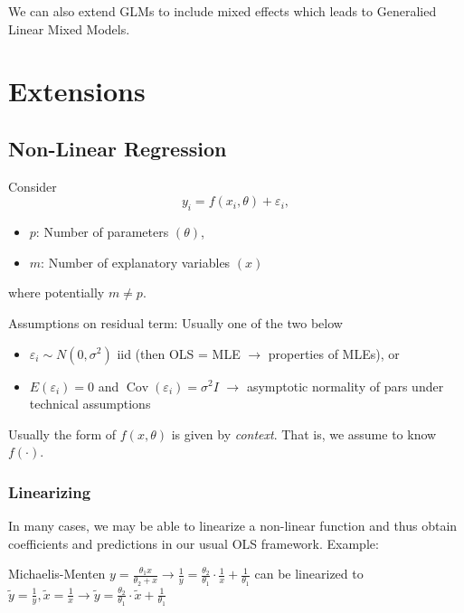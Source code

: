 \documentclass[11pt, %
	oneside, %
	english, %
	onehalfspacing, %
	]{article} %
\numberwithin{equation}{section}
\begin{document}
We can also extend GLMs to include mixed effects which leads to Generalied Linear Mixed Models.

\clearpage

\section{Extensions}

\subsection{Non-Linear Regression}

Consider
$$
y_i=f\left(x_i, \theta\right)+\varepsilon_i,
$$
\begin{itemize}
    \item $p$: Number of parameters $(\theta)$,
    \item $m$: Number of explanatory variables $(x)$
\end{itemize}
where potentially $m \neq p$.

Assumptions on residual term: Usually one of the two below
\begin{itemize}
	\item $\varepsilon_i \sim N\left(0, \sigma^2\right)$ iid (then OLS = MLE $\to$ properties of MLEs), or
    \item $E\left(\varepsilon_i\right)=0$ and $\operatorname{Cov}\left(\varepsilon_i\right)=\sigma^2 I$ $\to$ asymptotic normality of pars under technical assumptions
\end{itemize}

Usually the form of $f(x, \theta)$ is given by \emph{context}. That is, we assume to know $f(\cdot)$.


\subsubsection{Linearizing}

In many cases, we may be able to linearize a non-linear function and thus obtain coefficients and predictions in our usual OLS framework. Example:

Michaelis-Menten $y=\frac{\theta_1 x}{\theta_2+x} \rightarrow \frac{1}{y}=\frac{\theta_2}{\theta_1} \cdot \frac{1}{x}+\frac{1}{\theta_1}$ can be linearized to $\tilde{y}=\frac{1}{y}, \tilde{x}=\frac{1}{x} \rightarrow \tilde{y}=\frac{\theta_2}{\theta_1} \cdot \tilde{x}+\frac{1}{\theta_1}$
\end{document}
